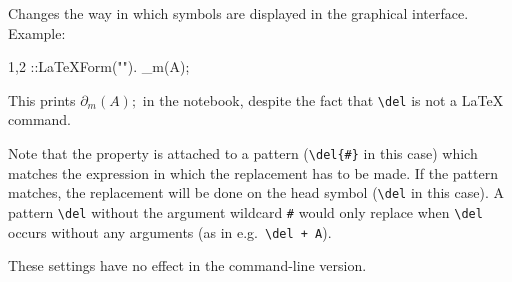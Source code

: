 
Changes the way in which symbols are displayed in the graphical
interface. Example:
\begin{screen}{1,2}
\del{#}::LaTeXForm("\partial").
\del_{m}(A);
\end{screen}
This prints $\partial_{m}(A);$ in the notebook, despite the fact
that \verb|\del| is not a \LaTeX{} command.

Note that the property is attached to a pattern (\verb|\del{#}| in
this case) which matches the expression in which the replacement has
to be made. If the pattern matches, the replacement will be done on
the head symbol (\verb|\del| in this case). A pattern \verb|\del|
without the argument wildcard \verb|#| would only replace
when \verb|\del| occurs without any arguments (as in 
e.g.~\verb|\del + A|).

These settings have no effect in the command-line version.

